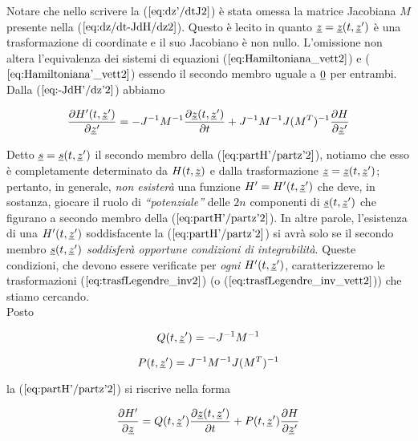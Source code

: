Notare che nello scrivere la ($ \ref{eq:dz'/dtJ2} $) è stata omessa la matrice Jacobiana $ M $ presente nella ($ \ref{eq:dz/dt-JdH/dz2} $). Questo è lecito in quanto $ \uline{z} = \uline{z}(t, \uline{z}')$ è una trasformazione di coordinate e il suo Jacobiano è non nullo. L'omissione non altera l'equivalenza dei sistemi di equazioni ($ \ref{eq:Hamiltoniana_vett2} $) e ($ \ref{eq:Hamiltoniana'_vett2} $) essendo il secondo membro uguale a $ \uline{0} $ per entrambi.\\
Dalla ($ \ref{eq:-JdH'/dz'2} $) abbiamo

\begin{equation} \label{eq:partH'/partz'2}
  \frac{\partial H'(t, \uline{z}')}{\partial \uline{z}'} = -J^{-1} M^{-1} \frac{\partial \uline{z}(t, \uline{z}')}{\partial t} + J^{-1} M^{-1} J (M^T)^{-1} \frac{\partial H}{\partial \uline{z}'}
\end{equation}

Detto $ \uline{s} = \uline{s}(t, \uline{z}') $ il secondo membro della ($ \ref{eq:partH'/partz'2} $), notiamo che esso è completamente determinato da $ H (t, \uline{z}) $ e dalla trasformazione $ \uline{z} = \uline{z}(t, \uline{z}') $; pertanto, in generale, \textit{non esisterà} una funzione $ H' = H' (t, \uline{z}') $ che deve, in sostanza, giocare il ruolo di \textit{``potenziale''} delle $ 2n $ componenti di $ \uline{s}(t, \uline{z}') $ che figurano a secondo membro della ($ \ref{eq:partH'/partz'2} $). In altre parole, l'esistenza di una $ H' (t, \uline{z}') $ soddisfacente la ($ \ref{eq:partH'/partz'2} $) si avrà solo se il secondo membro $ \uline{s}(t, \uline{z}') $ \textit{soddisferà opportune condizioni di integrabilità}. Queste condizioni, che devono essere verificate per \textit{ogni} $ H' (t, \uline{z}') $, caratterizzeremo le trasformazioni ($ \ref{eq:trasfLegendre_inv2} $) (o ($ \ref{eq:trasfLegendre_inv_vett2} $)) che stiamo cercando.\\


Posto

\begin{equation} \label{15}
  Q (t, \uline{z}') = -J^{-1} M^{-1}
\end{equation}

\begin{equation} \label{16}
  P (t, \uline{z}') = J^{-1} M^{-1} J (M^{T})^{-1}
\end{equation}

la ($ \ref{eq:partH'/partz'2} $) si riscrive nella forma

\begin{equation}
  \frac{\partial H'}{\partial \uline{z}} = Q(t,\uline{z}')\frac{\partial \uline{z}(t,\uline{z}')}{\partial t} + P(t,\uline{z}') \frac{\partial H}{\partial \uline{z}'}
\end{equation}

